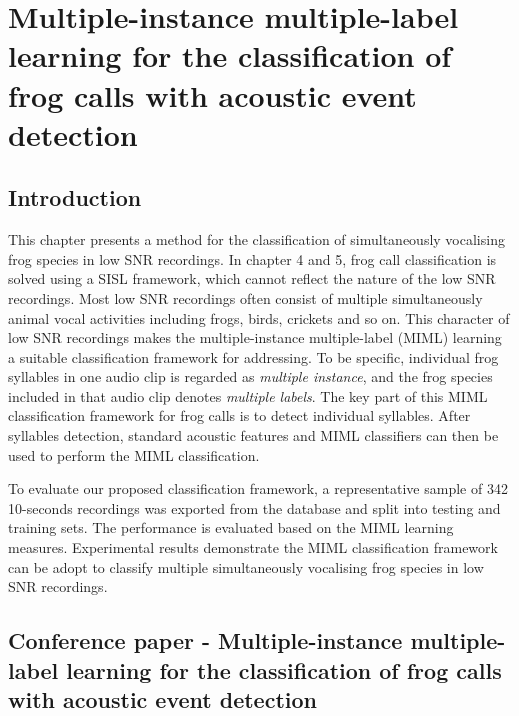 
\chapter{Multiple-instance multiple-label learning for the classification of frog calls with acoustic event detection}
\label{cha:cha6MIML}


\section{Introduction}
\label{sec:intro}

This chapter presents a method for the classification of simultaneously vocalising frog species in low SNR recordings. In chapter 4 and 5, frog call classification is solved using a SISL framework, which cannot reflect the nature of the low SNR recordings. Most low SNR recordings often 
consist of multiple simultaneously animal vocal activities including frogs, birds, crickets and so on. This character of low SNR recordings makes the multiple-instance multiple-label (MIML) learning a suitable classification framework for addressing. 
To be specific, individual frog syllables in one audio clip is regarded as \textit{multiple instance}, and the frog species included in that audio clip denotes \textit{multiple labels}. 
The key part of this MIML classification framework for frog calls is to detect individual syllables. After syllables detection, standard acoustic features and MIML classifiers can then be used to perform the MIML classification.


To evaluate our proposed classification framework, a representative sample of 342 10-seconds recordings was exported from the database and split into testing and training sets. The performance is evaluated based on the MIML learning measures. Experimental results demonstrate the MIML classification framework can be adopt to classify multiple simultaneously vocalising frog species in low SNR recordings.






\section{Conference paper - Multiple-instance multiple-label learning for the classification of frog calls with acoustic event detection}




